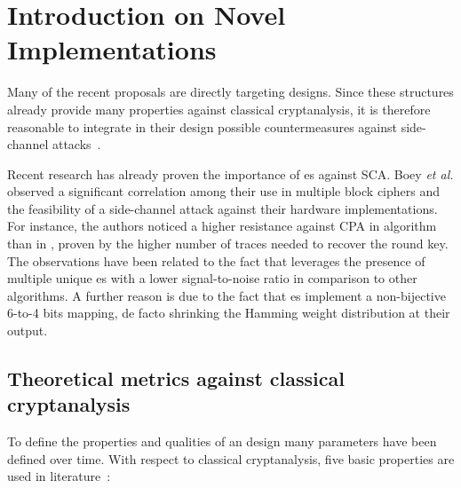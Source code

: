     
\section{Introduction on Novel \sbocs{} Implementations}
    
    Many of the recent proposals are directly targeting \sbocs{} designs. Since these structures already provide many properties against classical cryptanalysis, it is therefore reasonable to integrate in their design possible countermeasures against side-channel attacks~\cite{carlet2017trade}.
        
    Recent research has already proven the importance of \sbocs{}es against SCA. Boey \emph{et al.} observed a significant correlation among their use in multiple block ciphers and the feasibility of a side-channel attack against their hardware implementations. For instance, the authors noticed a higher resistance against CPA in \des{} algorithm than in \aes{}, proven by the higher number of traces needed to recover the round key. The observations have been related to the fact that \des{} leverages the presence of multiple unique \sbocs{}es with a lower signal-to-noise ratio in comparison to other algorithms. A further reason is due to the fact that \des{} \sbocs{}es implement a non-bijective 6-to-4 bits mapping, de facto shrinking the Hamming weight distribution at their output.

    \subsection{Theoretical metrics against classical cryptanalysis}
        To define the properties and qualities of an \sbocs{} design many parameters have been defined over time. With respect to classical cryptanalysis, five basic properties are used in literature~\cite{accikkapi2019side}:
        
